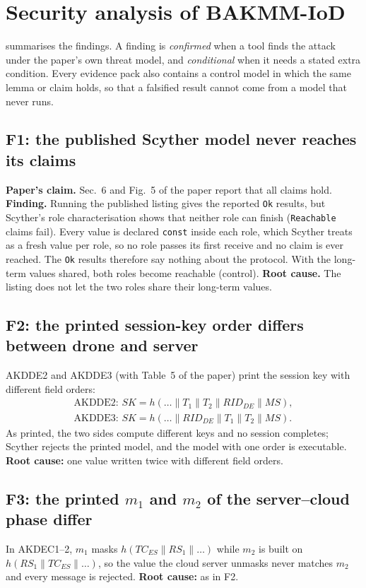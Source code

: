\section{Security analysis of BAKMM-IoD}\label{sec:bakmm-analysis}

 summarises the findings. A finding is \emph{confirmed} when a tool finds the attack under the paper's own
threat model, and \emph{conditional} when it needs a stated extra condition. Every evidence pack also contains a control
model in which the same lemma or claim holds, so that a falsified result cannot come from a model that never runs.


\subsection{F1: the published Scyther model never reaches its claims}\label{sec:f1}
\textbf{Paper's claim.} Sec.~6 and Fig.~5 of the paper report that all claims hold.
\textbf{Finding.} Running the published listing gives the reported \texttt{Ok} results, but Scyther's role
characterisation shows that neither role can finish (\texttt{Reachable} claims fail). Every value is declared \texttt{const}
inside each role, which Scyther treats as a fresh value per role, so no role passes its first receive and no claim is ever
reached. The \texttt{Ok} results therefore say nothing about the protocol. With the long-term values shared, both roles become
reachable (control).
\textbf{Root cause.} The listing does not let the two roles share their long-term values.

\subsection{F2: the printed session-key order differs between drone and server}\label{sec:f2}
AKDDE2 and AKDDE3 (with Table~5 of the paper) print the session key with different field orders:
\begin{gather*} \text{AKDDE2: } SK = h(\dots\|T_1\|T_2\|RID_{DE}\|MS), \\ \text{AKDDE3: } SK = h(\dots\|RID_{DE}\|T_1\|T_2\|MS). \end{gather*}
As printed, the two sides compute different keys and no session completes; Scyther rejects the printed model, and the model with
one order is executable. \textbf{Root cause:} one value written twice with different field orders.

\subsection{F3: the printed $m_1$ and $m_2$ of the server--cloud phase differ}\label{sec:f3}
In AKDEC1--2, $m_1$ masks $h(TC_{ES}\|RS_1\|\dots)$ while $m_2$ is built on $h(RS_1\|TC_{ES}\|\dots)$, so the value the
cloud server unmasks never matches $m_2$ and every message is rejected. \textbf{Root cause:} as in F2.

